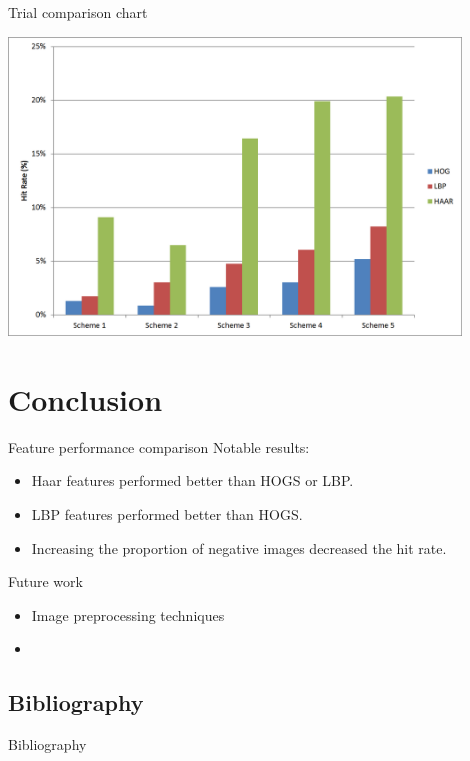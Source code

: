 \documentclass{beamer}
\begin{document}
\begin{frame}{Trial comparison chart}
	\begin{center}
		\includegraphics[width=0.9\textwidth]{results_graph}
	\end{center}
\end{frame}

\section{Conclusion}

\begin{frame}{Feature performance comparison}
	Notable results: \par
	\begin{itemize}
		\item Haar features performed better than HOGS or LBP.
		\item LBP features performed better than HOGS.
		\item Increasing the proportion of negative images decreased the hit rate.
	\end{itemize}
\end{frame}

\begin{frame}{Future work}
	\begin{itemize}
		\item Image preprocessing techniques
		\item 
	\end{itemize}
\end{frame}

\subsection{Bibliography}

\begin{frame}{Bibliography}
	\footnotesize
	
	
\end{frame}
\end{document}
